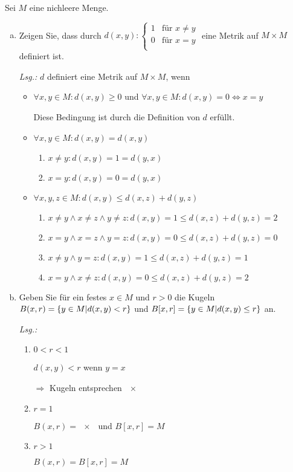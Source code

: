 \documentclass{article}
\begin{document}
Sei $M$ eine nichleere Menge.
\begin{enumerate}[a)]
\item Zeigen Sie, dass durch $d(x, y) \colon \begin{cases}
    1 & \text{für $x \ne y$} \\
    0 & \text{für $x = y$} \\
  \end{cases}$ eine Metrik auf $M \times M$ definiert ist.

  \textit{Lsg.:} $d$ definiert eine Metrik auf $M \times M$, wenn
  \begin{itemize}
  \item $\forall x, y \in M \colon d(x,y) \geq 0$ und
    $\forall x,y \in M \colon d(x,y) = 0 \iff x = y$

    Diese Bedingung ist durch die Definition von $d$ erfüllt.

  \item $\forall x,y \in M \colon d(x, y) = d(x, y)$
    \begin{enumerate}[label={Fall \arabic*:},leftmargin=*]
    \item $x \ne y \colon d(x, y) = 1 = d(y, x)$
    \item $x = y \colon d(x, y) = 0 = d(y, x)$
    \end{enumerate}
    
  \item $\forall x,y,z \in M \colon d(x,y) \leq d(x,z) + d(y,z)$
    \begin{enumerate}[label={Fall \arabic*:},leftmargin=*]
    \item $x \ne y \land x \ne z \land y \ne z \colon d(x, y) = 1 \leq d(x, z) + d(y, z) = 2$
    \item $x = y \land x = z \land y = z \colon d(x, y) = 0 \leq d(x, z) + d(y, z) = 0$
    \item $x \ne y \land y = z \colon d(x, y) = 1 \leq d(x, z) + d(y, z) = 1$
    \item $x = y \land x \ne z \colon d(x, y) = 0 \leq d(x, z) + d(y, z) = 2$
    \end{enumerate}
    
  \end{itemize}
  
\item Geben Sie für ein festes $x \in M$ und $r > 0$ die Kugeln
  $B(x, r) = \qty{ y \in M \middle| d(x, y) < r}$ und
  $B[x, r] = \qty{ y \in M \middle| d(x, y) \leq r}$ an.

  \textit{Lsg.:}
  \begin{enumerate}[label={Fall \arabic*:},leftmargin=*]
  \item $0 < r < 1$

    $d(x, y) < r$ wenn $y = x$

    $\Rightarrow$ Kugeln entsprechen $\qty{x}$
  \item $r = 1$

    $B(x, r) = \qty{x}$ und $B[x,r] = M$
  \item $r > 1$

    $B(x, r) = B[x, r] = M$
  \end{enumerate}
\end{enumerate}
\end{document}
